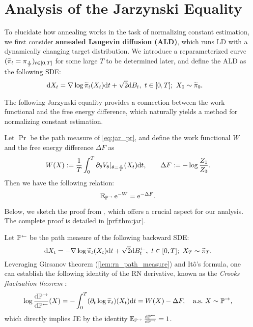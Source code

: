 \section{Analysis of the Jarzynski Equality}
\label{sec:jar}
To elucidate how annealing works in the task of normalizing constant estimation, we first consider \textbf{annealed Langevin diffusion (ALD)}, which runs LD with a dynamically changing target distribution. We introduce a reparameterized curve $(\widetilde{\pi}_t=\pi_{\frac{t}{T}})_{t\in[0,T]}$ for some large $T$ to be determined later, and define the ALD as the following SDE:
\begin{align}
    \mathrm{d} X_t&=\nabla\log\widetilde{\pi}_t(X_t)\mathrm{d} t+\sqrt{2}\mathrm{d} B_t,~t\in[0,T];~X_0\sim\widetilde{\pi}_0.
    \label{eq:jar_pr}
\end{align}

The following Jarzynski equality provides a connection between the work functional and the free energy difference, which naturally yields a method for normalizing constant estimation.

\begin{theorem}
    Let $\Pr$ be the path measure of \cref{eq:jar_pr}, and define the work functional $W$ and the free energy difference $\Delta F$ as
    $$W(X):=\frac{1}{T}\int_0^T\partial_\theta V_\theta|_{\theta=\frac{t}{T}}(X_t)\mathrm{d} t,\qquad\Delta F:=-\log\frac{Z_1}{Z_0}.$$
    Then we have the following relation:
    $$\operatorname{\mathbb{E}}_{\mathbb{P}^\to}\mathrm{e}^{-W}=\mathrm{e}^{-\Delta F}.$$
    \label{thm:jar}
\end{theorem}
\vspace{-2em}

Below, we sketch the proof from \citet[Prop. 3.3]{vargas2024transport}, which offers a crucial aspect for our analysis. The complete proof is detailed in \cref{prf:thm:jar}.

\begin{sketchofproof}
    Let $\mathbb{P}^\gets$ be the path measure of the following backward SDE:
    \begin{equation}
        \mathrm{d} X_t=-\nabla\log\widetilde{\pi}_t(X_t)\mathrm{d} t+\sqrt{2}\mathrm{d}B^\gets_t,~t\in[0,T];~X_T\sim\widetilde{\pi}_T.
        \label{eq:jar_pl}        
    \end{equation}
    Leveraging Girsanov theorem (\cref{lem:rn_path_measure}) and It\^o's formula, one can establish the following identity of the RN derivative, known as the \emph{Crooks fluctuation theorem} \citep{crooks1998nonequilibrium,crooks1999entropy}:
    \begin{equation}
        \log\frac{\mathrm{d}\mathbb{P}^\to}{\mathrm{d}\mathbb{P}^\gets}(X)=-\int_0^T(\partial_t\log\widetilde{\pi}_t)(X_t)\mathrm{d} t=W(X)-\Delta F,\quad\text{a.s.}~X\sim\mathbb{P}^\to,
        \label{eq:jar_rn}
    \end{equation}
    which directly implies JE by the identity $\operatorname{\mathbb{E}}_{\mathbb{P}^\to}{\frac{\mathrm{d}\mathbb{P}^\gets}{\mathrm{d}\mathbb{P}^\to}}=1$. 
\end{sketchofproof}

